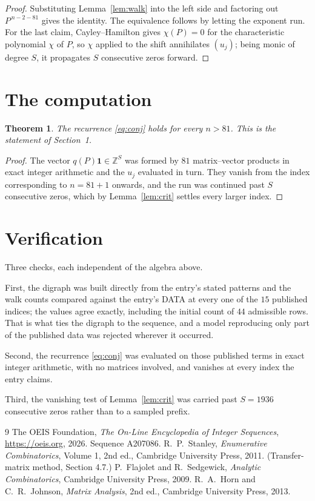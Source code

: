 \documentclass[11pt,a4paper]{article}
\theoremstyle{plain}
\newtheorem{theorem}{Theorem}
\theoremstyle{definition}
\begin{document}
\begin{proof}
Substituting Lemma~\ref{lem:walk} into the left side and factoring out
$P^{\,n-2-81}$ gives the identity. The equivalence follows by letting the exponent
run. For the last claim, Cayley--Hamilton gives $\chi(P)=0$ for the characteristic
polynomial $\chi$ of $P$, so $\chi$ applied to the shift annihilates $(u_j)$; being monic of
degree $S$, it propagates $S$ consecutive zeros forward.
\end{proof}

\section{The computation}

\begin{theorem}
The recurrence \eqref{eq:conj} holds for every $n>81$. This is the statement of
Section~1.
\end{theorem}

\begin{proof}
The vector $q(P)\mathbf{1}\in\mathbb{Z}^{S}$ was formed by $81$ matrix--vector
products in exact integer arithmetic and the $u_j$ evaluated in turn. They vanish from the
index corresponding to $n=81+1$ onwards, and the run was continued past $S$ consecutive
zeros, which by Lemma~\ref{lem:crit} settles every larger index.
\end{proof}

\section{Verification}

Three checks, each independent of the algebra above.

First, the digraph was built directly from the entry's stated patterns and the walk counts
compared against the entry's DATA at every one of the $15$ published indices; the
values agree exactly, including the initial count of $44$ admissible rows. That is
what ties the digraph to the sequence, and a model reproducing only part of the published
data was rejected wherever it occurred.

Second, the recurrence \eqref{eq:conj} was evaluated on those published terms in exact
integer arithmetic, with no matrices involved, and vanishes at every index the entry claims.

Third, the vanishing test of Lemma~\ref{lem:crit} was carried past $S=1936$ consecutive
zeros rather than to a sampled prefix.

\begin{thebibliography}{9}
 The OEIS Foundation, \emph{The On-Line Encyclopedia of Integer
Sequences}, \url{https://oeis.org}, 2026. Sequence A207086.
 R.~P.~Stanley, \emph{Enumerative Combinatorics}, Volume 1, 2nd ed.,
Cambridge University Press, 2011. (Transfer-matrix method, Section 4.7.)
 P.~Flajolet and R.~Sedgewick, \emph{Analytic Combinatorics}, Cambridge
University Press, 2009.
 R.~A.~Horn and C.~R.~Johnson, \emph{Matrix Analysis}, 2nd ed., Cambridge
University Press, 2013.
\end{thebibliography}
\end{document}
